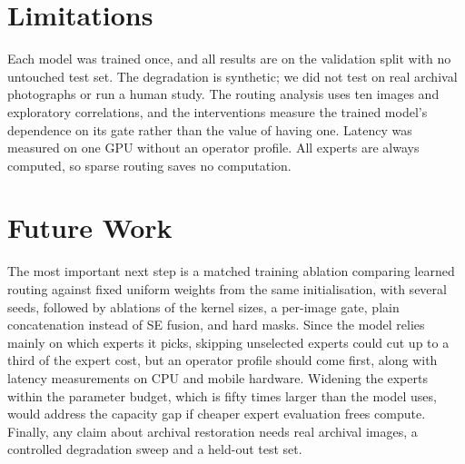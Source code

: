 \documentclass[12pt,a4paper,oneside]{NITR}
\begin{document}
\section{Limitations}\label{sec:limitations}

Each model was trained once, and all results are on the validation split
with no untouched test set. The degradation is synthetic; we did not test on
real archival photographs or run a human study. The routing analysis uses ten
images and exploratory correlations, and the interventions measure the
trained model's dependence on its gate rather than the value of having one.
Latency was measured on one GPU without an operator profile. All experts are
always computed, so sparse routing saves no computation.

\section{Future Work}\label{sec:future}

The most important next step is a matched training ablation comparing
learned routing against fixed uniform weights from the same initialisation,
with several seeds, followed by ablations of the kernel sizes, a per-image
gate, plain concatenation instead of SE fusion, and hard masks. Since the
model relies mainly on which experts it picks, skipping unselected experts
could cut up to a third of the expert cost, but an operator profile should
come first, along with latency measurements on CPU and mobile hardware.
Widening the experts within the parameter budget, which is fifty times larger
than the model uses, would address the capacity gap if cheaper expert
evaluation frees compute. Finally, any claim about archival restoration
needs real archival images, a controlled degradation sweep and a held-out
test set.


\cleardoublepage

\lhead{}
\renewcommand\bibname{References}
{
	\fontsize{10}{12}
	\selectfont
	
}
\cleardoublepage

%

\end{document}

